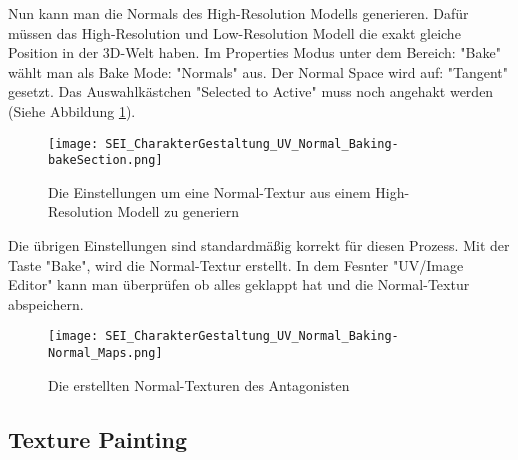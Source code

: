 Nun kann man die Normals des High-Resolution Modells generieren. Dafür müssen das High-Resolution und Low-Resolution
Modell die exakt gleiche Position in der 3D-Welt haben. Im Properties Modus unter dem Bereich: "Bake" wählt man als
Bake Mode: "Normals" aus. Der Normal Space wird auf: "Tangent" gesetzt. Das Auswahlkästchen "Selected to Active" muss
noch angehakt werden (Siehe Abbildung \ref{picture:baking_settings}).

\begin{figure}[h]
    \centering
    \texttt{[image: SEI\_CharakterGestaltung\_UV\_Normal\_Baking-bakeSection.png]}
    \caption{Die Einstellungen um eine Normal-Textur aus einem High-Resolution Modell zu generiern}
    \label{picture:baking_settings}
\end{figure}


Die übrigen Einstellungen sind standardmäßig korrekt für diesen Prozess. Mit der Taste "Bake",
wird die Normal-Textur erstellt. In dem Fesnter "UV/Image Editor" kann man überprüfen ob alles geklappt hat und die
Normal-Textur abspeichern.

\begin{figure}[h]
    \centering
    \texttt{[image: SEI\_CharakterGestaltung\_UV\_Normal\_Baking-Normal\_Maps.png]}
    \caption{Die erstellten Normal-Texturen des Antagonisten}
    \label{picture:antagonist_normals}
\end{figure}


\subsection{Texture Painting}
